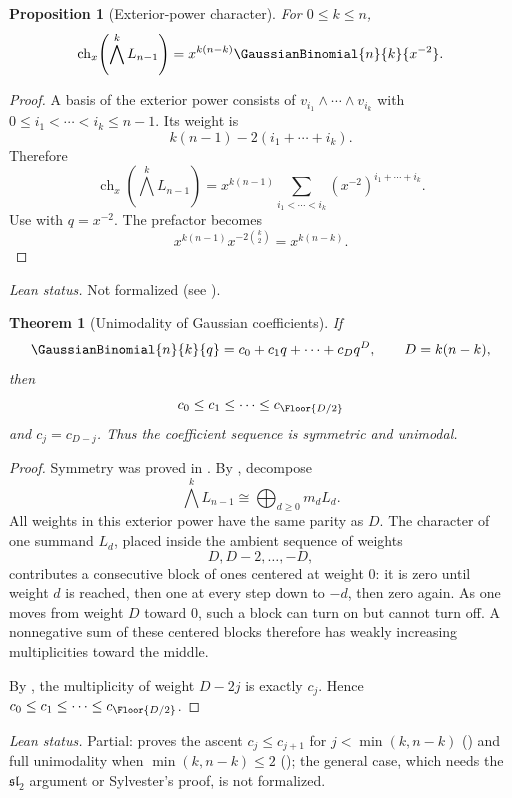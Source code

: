 \documentclass[11pt,a4paper,oneside,openany]{book}
\newtheorem{theorem}{Theorem}[chapter]
\newtheorem{proposition}[proposition]{Proposition}
\theoremstyle{definition}
\theoremstyle{remark}
\newcommand{\WeightCharacter}[2]{\operatorname{ch}_{#2}\!\left(#1\right)}
\begin{document}
\begin{proposition}[Exterior-power character]\label{prop:exterior-character}
For $0\le k\le n$,
\[
 \WeightCharacter{\bigwedge^kL_{n-1}}{x}
 =x^{k(n-k)}\GaussianBinomial{n}{k}{x^{-2}}.
\]
\end{proposition}

\begin{proof}
A basis of the exterior power consists of
\(
 v_{i_1}\wedge\cdots\wedge v_{i_k}
\)
with $0\le i_1<\cdots<i_k\le n-1$.  Its weight is
\[
 k(n-1)-2(i_1+\cdots+i_k).
\]
Therefore
\[
 \WeightCharacter{\bigwedge^kL_{n-1}}{x}=x^{k(n-1)}
 \sum_{i_1<\cdots<i_k}(x^{-2})^{i_1+\cdots+i_k}.
\]
Use  with $q=x^{-2}$.  The prefactor becomes
\[
 x^{k(n-1)}x^{-2\binom k2}=x^{k(n-k)}.
\]
\end{proof}

\emph{Lean status.}  Not formalized (see ).


\begin{theorem}[Unimodality of Gaussian coefficients]\label{thm:qbinom-unimodal}
If
\[
 \GaussianBinomial{n}{k}{q}=c_0+c_1q+\cdots+c_Dq^D,
 \qquad D=k(n-k),
\]
then
\[
 c_0\le c_1\le\cdots\le c_{\Floor{D/2}}
\]
and $c_j=c_{D-j}$.  Thus the coefficient sequence is symmetric and unimodal.
\end{theorem}

\begin{proof}
Symmetry was proved in .  By , decompose
\[
 \bigwedge^kL_{n-1}\cong\bigoplus_{d\ge0}m_dL_d.
\]
All weights in this exterior power have the same parity as $D$.  The character of one summand $L_d$, placed inside the ambient sequence of weights
\[
 D,D-2,\dots,-D,
\]
contributes a consecutive block of ones centered at weight $0$: it is zero until weight $d$ is reached, then one at every step down to $-d$, then zero again.  As one moves from weight $D$ toward $0$, such a block can turn on but cannot turn off.  A nonnegative sum of these centered blocks therefore has weakly increasing multiplicities toward the middle.

By , the multiplicity of weight $D-2j$ is exactly $c_j$.  Hence $c_0\le c_1\le\cdots\le c_{\Floor{D/2}}$.
\end{proof}

\emph{Lean status.}  Partial:  proves the ascent
$c_{j}\le c_{j+1}$ for $j<\min(k,n-k)$ () and
full unimodality when $\min(k,n-k)\le2$ ();
the general case, which needs the $\mathfrak{sl}_2$ argument or Sylvester's proof, is
not formalized.
\end{document}
